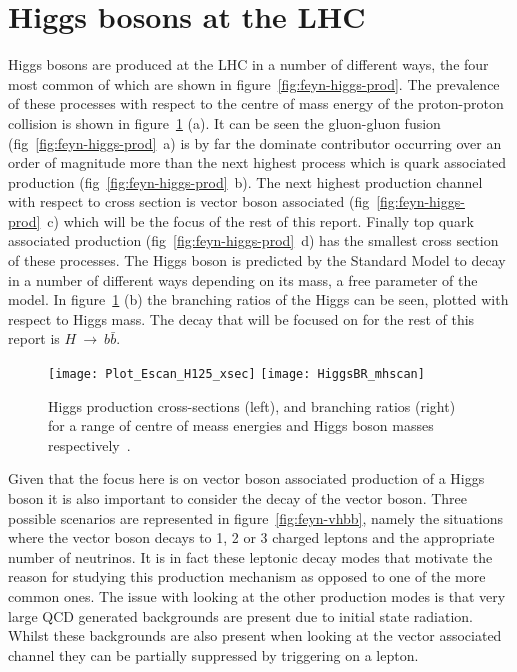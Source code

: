\section{Higgs bosons at the LHC}
%
Higgs bosons are produced at the LHC in a number of different ways, the four
most common of which are shown in figure~\ref{fig:feyn-higgs-prod}.
 The prevalence of these processes with
respect to the centre of mass energy of the proton-proton collision is shown in
figure~\ref{fig:higgs-br} (a). It can be seen the gluon-gluon fusion
(fig~\ref{fig:feyn-higgs-prod}~a) is by far the dominate contributor occurring
over an order of magnitude more than the next highest process which is quark
associated production (fig~\ref{fig:feyn-higgs-prod}~b). The next highest
production channel with respect to cross section is vector boson associated
(fig~\ref{fig:feyn-higgs-prod}~c) which will be the focus of the rest of this
report. Finally top quark associated production
(fig~\ref{fig:feyn-higgs-prod}~d) has the smallest cross section of these
processes.  The Higgs boson is predicted by the Standard Model to decay in a
number of different ways depending on its mass, a free parameter of the model.
In figure~\ref{fig:higgs-br} (b) the branching ratios of the Higgs can be seen,
plotted with respect to Higgs mass. The decay that will be focused on for the
rest of this report is $H~\rightarrow~b\bar{b}$.
\begin{figure}[ht]
  \centering
  \texttt{[image: Plot\_Escan\_H125\_xsec]}%
  \texttt{[image: HiggsBR\_mhscan]}

  \caption{Higgs production cross-sections (left), and branching
    ratios (right) for a range of centre of meass energies and Higgs boson
    masses respectively~\cite{CERN-yellow-4}.}%
  \label{fig:higgs-br}
\end{figure}%
Given that the focus here is on vector boson associated production of a Higgs
boson it is also important to consider the decay of the vector boson. Three
possible scenarios are represented in figure~\ref{fig:feyn-vhbb}, namely the
situations where the vector boson decays to 1, 2 or 3 charged leptons and the
appropriate number of neutrinos.  It is in fact
these leptonic decay modes that motivate the reason for studying this production
mechanism as opposed to one of the more common ones. The issue with looking at
the other production modes is that very large QCD generated backgrounds are
present due to initial state radiation. Whilst these backgrounds are also
present when looking at the vector associated channel they can be partially
suppressed by triggering on a lepton.
